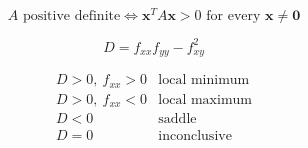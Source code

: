 \[
\boxed{
    A\text{ positive definite}
    \Longleftrightarrow
    \mathbf x^T A\mathbf x>0
    \text{ for every }\mathbf x\ne\mathbf 0
}
\]

\[
\boxed{
    D=f_{xx}f_{yy}-f_{xy}^2
}
\]

\[
\boxed{
\begin{array}{c|c}
D>0,\ f_{xx}>0 & \text{local minimum}\\
D>0,\ f_{xx}<0 & \text{local maximum}\\
D<0 & \text{saddle}\\
D=0 & \text{inconclusive}
\end{array}
}
\]